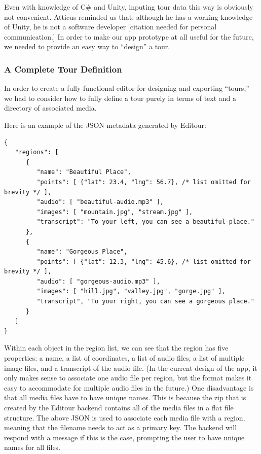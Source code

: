 \documentclass[a4paper, 10pt, american, titlepage]{article}
\begin{document}
Even with knowledge of C\# and Unity, inputing tour data this way is obviously
not convenient. Atticus reminded us that, although he has a working knowledge
of Unity, he is not a software developer [citation needed for personal
communication.] In order to make our app prototype at all useful for the
future, we needed to provide an easy way to ``design'' a tour.

\subsubsection{A Complete Tour Definition}
\label{sec:tourDefinition}

In order to create a fully-functional editor for designing and exporting
``tours,'' we had to consider how to fully define a tour purely in terms
of text and a directory of associated media.

Here is an example of the JSON metadata generated by Editour:

\begin{verbatim}
{
   "regions": [
      {
         "name": "Beautiful Place",
         "points": [ {"lat": 23.4, "lng": 56.7}, /* list omitted for brevity */ ],
         "audio": [ "beautiful-audio.mp3" ],
         "images": [ "mountain.jpg", "stream.jpg" ],
         "transcript": "To your left, you can see a beautiful place."
      },
      {
         "name": "Gorgeous Place",
         "points": [ {"lat": 12.3, "lng": 45.6}, /* list omitted for brevity */ ],
         "audio": [ "gorgeous-audio.mp3" ],
         "images": [ "hill.jpg", "valley.jpg", "gorge.jpg" ],
         "transcript", "To your right, you can see a gorgeous place."
      }
   ]
}
\end{verbatim}

Within each object in the region list, we can see that the region has five
properties: a name, a list of coordinates, a list of audio files, a list of
multiple image files, and a transcript of the audio file. (In the current
design of the app, it only makes sense to associate one audio file per region,
but the format makes it easy to accommodate for multiple audio files in the
future.) One disadvantage is that all media files have to have unique names.
This is because the zip that is created by the Editour backend contains all of
the media files in a flat file structure. The above JSON is used to associate
each media file with a region, meaning that the filename needs to act as a
primary key. The backend will respond with a message if this is the case,
prompting the user to have unique names for all files.
\end{document}
